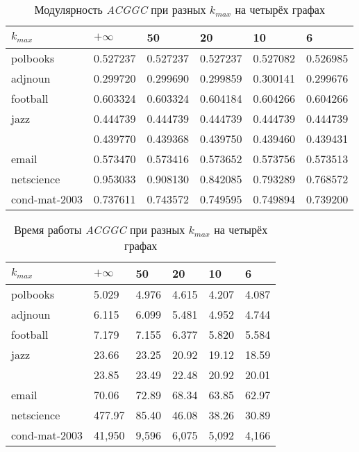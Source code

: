 \begin{table}[H]
 	\caption{Модулярность \emph{ACGGC} при разных $k_{max}$ на четырёх графах}
 	\label{tab:es-kmax-q}
 	\begin{tabularx}{\textwidth}{XR{1.5cm}R{1.5cm}R{1.5cm}R{1.5cm}R{1.5cm}}\hline
 		$k_{max}$		& $+\infty$	& 50		& 20		& 10		& 6 		\\\hline
 		polbooks		& 0.527237	& 0.527237	& 0.527237	& 0.527082	& 0.526985	\\
 		adjnoun			& 0.299720	& 0.299690	& 0.299859	& 0.300141	& 0.299676	\\
 		football		& 0.603324	& 0.603324	& 0.604184	& 0.604266	& 0.604266	\\
 		jazz			& 0.444739	& 0.444739	& 0.444739	& 0.444739	& 0.444739	\\
 		\celegans		& 0.439770	& 0.439368	& 0.439750	& 0.439460	& 0.439431	\\
 		email			& 0.573470	& 0.573416	& 0.573652	& 0.573756	& 0.573513	\\
 		netscience		& 0.953033	& 0.908130	& 0.842085	& 0.793289	& 0.768572	\\
 		cond-mat-2003	& 0.737611	& 0.743572	& 0.749595	& 0.749894	& 0.739200	\\\hline
 	\end{tabularx}
\end{table}

\begin{table}[H]
 	\caption{Время работы \emph{ACGGC} при разных $k_{max}$ на четырёх графах}
 	\label{tab:es-kmax-t}
 	\begin{tabularx}{\textwidth}{XR{1.5cm}R{1.5cm}R{1.5cm}R{1.5cm}R{1.5cm}}\hline
 		$k_{max}$		& $+\infty$	& 50		& 20		& 10		& 6 		\\\hline
 		polbooks		& 5.029		& 4.976		& 4.615		& 4.207		& 4.087		\\
 		adjnoun			& 6.115		& 6.099		& 5.481		& 4.952		& 4.744		\\
 		football		& 7.179		& 7.155		& 6.377		& 5.820		& 5.584		\\
 		jazz			& 23.66		& 23.25		& 20.92		& 19.12		& 18.59		\\
 		\celegans		& 23.85		& 23.49		& 22.48		& 20.92		& 20.01		\\
 		email			& 70.06		& 72.89		& 68.34		& 63.85		& 62.97		\\
 		netscience		& 477.97	& 85.40		& 46.08		& 38.26		& 30.89		\\
 		cond-mat-2003	& 41,950	& 9,596		& 6,075		& 5,092		& 4,166		\\\hline
 	\end{tabularx}
\end{table}


